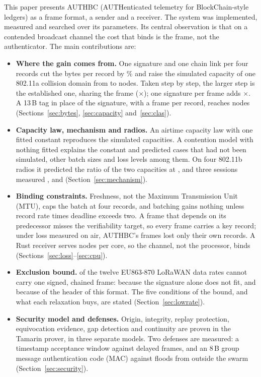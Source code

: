 \documentclass[lineno,pdflatex,sn-mathphys-num]{sn-jnl}
\renewcommand{\_}{\authbcunderscore\allowbreak}
\begin{document}
This paper presents AUTHBC (AUTHenticated telemetry for BlockChain-style ledgers) as a frame
format, a sender and a receiver. The system was implemented, measured and searched over its
parameters. Its central observation is that on a contended broadcast channel the cost that binds
is the frame, not the authenticator. The main contributions are:
\begin{itemize}
\item \textbf{Where the gain comes from.} One signature and one chain link per four records cut
the bytes per record by \saveLean\% and raise the simulated capacity of one 802.11a collision
domain from \nmaxLeanBase{} to \nmaxLeanDesign{} nodes. Taken step by step, the larger step is
the established one, sharing the frame (\stepShareLean$\times$); one signature per frame adds
\stepSignLean$\times$. A 13\,B tag in place of the signature, with a frame per record, reaches
\crossMav{} nodes (Sections~\ref{sec:bytes}, \ref{sec:capacity} and~\ref{sec:clas}).
\item \textbf{Capacity law, mechanism and radios.} An airtime capacity law with one fitted
constant reproduces the simulated capacities. A contention model with nothing fitted explains the
constant and predicted cases that had not been simulated, other batch sizes and loss levels
among them. On four 802.11b radios it predicted the ratio of the two capacities at
\hwModelRatio, and three sessions measured \hwRatio, \hwRepeatRatio{} and \hwThirdRatio{}
(Section~\ref{sec:mechanism}).
\item \textbf{Binding constraints.} Freshness, not the Maximum Transmission Unit (MTU), caps the
batch at four records, and batching gains nothing unless record rate times deadline exceeds two.
A frame that depends on its predecessor misses the verifiability target, so every frame carries a
key record; under loss measured on air, AUTHBC's frames lost only their own records. A Rust
receiver serves \rxRustNodes{} nodes per core, so the channel, not the processor, binds
(Sections~\ref{sec:loss}--\ref{sec:cpu}).
\item \textbf{Exclusion bound.} \exclCountCap{} of the twelve EU863-870 LoRaWAN data rates cannot
carry one signed, chained frame: \exclSigCount{} because the signature alone does not fit, and
\exclFmtCount{} because of the header of this format. The five conditions of the bound, and what
each relaxation buys, are stated (Section~\ref{sec:lowrate}).
\item \textbf{Security model and defenses.} Origin, integrity, replay protection, equivocation
evidence, gap detection and continuity are proven in the Tamarin prover, in three separate
models. Two defenses are measured: a timestamp acceptance window against delayed frames, and an
8\,B group message authentication code (MAC) against floods from outside the swarm
(Section~\ref{sec:security}).
\end{itemize}
\end{document}

